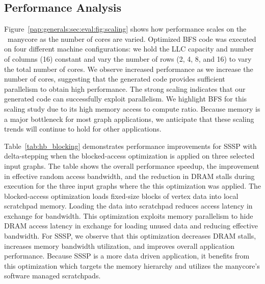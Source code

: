 \subsection{Performance Analysis}
Figure~\ref{pap:generals:sec:eval:fig:scaling} shows how performance scales on the \hb~manycore as the number of cores are varied.
Optimized BFS code was executed on four different machine configurations: we hold the LLC capacity and number of columns (16) constant
and vary the number of rows (2, 4, 8, and 16) to vary the total number of cores.
We observe increased performance as we increase the number of cores, suggesting that the generated code provides sufficient parallelism to obtain high performance.
The strong scaling indicates that our generated code can successfully exploit parallelism.
We highlight BFS for this scaling study due to its high memory access to compute ratio.
Because memory is a major bottleneck for most graph applications, we anticipate that these scaling trends will continue to hold for other applications. 

Table~\ref{tab:hb_blocking} demonstrates performance improvements for SSSP with delta-stepping when the blocked-access optimization is applied on three selected input graphs.
The table shows the overall performance speedup, the improvement in effective random access bandwidth, and the reduction in DRAM stalls during execution for the three input graphs where the this optimization was applied.
The blocked-access optimization loads fixed-size blocks of vertex data into local scratchpad memory.
Loading the data into scratchpad reduces access latency in exchange for bandwidth.
This optimization exploits memory parallelism to hide DRAM access latency in exchange for loading unused data and reducing effective bandwidth.
For SSSP, we observe that this optimization decreases DRAM stalls, increases memory bandwidth utilization, and improves overall application performance.
Because SSSP is a more data driven application, it benefits from this optimization which targets the memory hierarchy and utilizes the manycore's software managed scratchpads.

